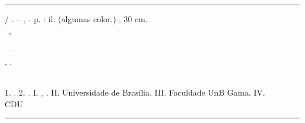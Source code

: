 \begin{fichacatalografica}
\selectfont
\vspace*{\fill} %
\hrule	%
\begin{center} %
\begin{minipage}[c]{12.5cm} %
\imprimirautor
\hspace{0.5cm} \imprimirtitulo / \imprimirautor. --
\imprimirlocal, \imprimirano-
\hspace{0.5cm} \pageref{LastPage} p. : il. (algumas color.) ; 30 cm.\\
\hspace{0.5cm} \imprimirorientadorRotulo~\orientsobrenome, \orientnome\\
\hspace{0.5cm}
\parbox[t]{\textwidth}{\imprimirtipotrabalho~--~\instituicaoi\\\instituicaoii,
\imprimirano.}\\
\hspace{0.5cm}
1. \pchaveinome.
2. \pchaveiinome.
I. \orientsobrenome, \orientnome.
II. Universidade de Brasília.
III. Faculdade UnB Gama.
IV. \imprimirtitulo\\
\hspace{8.75cm} CDU \\ %
\end{minipage}
\end{center}
\hrule
\pagebreak
\end{fichacatalografica}